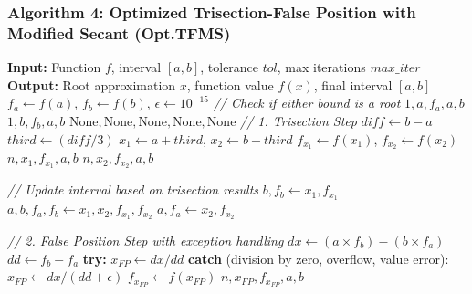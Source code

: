 \documentclass[amsmath, amssymb, aps]{revtex4-2}
\begin{document}
\subsubsection{Algorithm 4: Optimized Trisection-False Position with Modified Secant (Opt.TFMS)}

    \begin{algorithmic}[1]
    \State \textbf{Input:} Function $f$, interval $[a, b]$, tolerance $tol$, max iterations $max\_iter$
    \State \textbf{Output:} Root approximation $x$, function value $f(x)$, final interval $[a, b]$
    \State $f_a \gets f(a)$, $f_b \gets f(b)$, $\epsilon \gets 10^{-15}$
    \State \textit{// Check if either bound is a root}
        \State \Return $1, a, f_a, a, b$
    \EndIf
        \State \Return $1, b, f_b, a, b$
    \EndIf
        \State \Return $\text{None}, \text{None}, \text{None}, \text{None}, \text{None}$
    \EndIf
        \State \textit{// 1. Trisection Step}
        \State $diff \gets b - a$
        \State $third \gets (diff/3)$
        \State $x_1 \gets a + third$, $x_2 \gets b - third$
        \State $f_{x_1} \gets f(x_1)$, $f_{x_2} \gets f(x_2)$
         \State \Return $n, x_1, f_{x_1}, a, b$ \EndIf
         \State \Return $n, x_2, f_{x_2}, a, b$ \EndIf
        
        \State \textit{// Update interval based on trisection results}
            \State $b, f_b \gets x_1, f_{x_1}$
            \State $a, b, f_a, f_b \gets x_1, x_2, f_{x_1}, f_{x_2}$
        \Else
            \State $a, f_a \gets x_2, f_{x_2}$
        \EndIf
    
        \State \textit{// 2. False Position Step with exception handling}
        \State $dx \gets (a \times f_b) - (b \times f_a)$
        \State $dd \gets f_b - f_a$
        \State \textbf{try:}
        \State \quad $x_{FP} \gets dx / dd$
        \State \textbf{catch} (division by zero, overflow, value error):
        \State \quad $x_{FP} \gets dx / (dd + \epsilon)$
        \State $f_{x_{FP}} \gets f(x_{FP})$
            \State \Return $n, x_{FP}, f_{x_{FP}}, a, b$
        \EndIf
    

\end{algorithmic}
\end{document}
